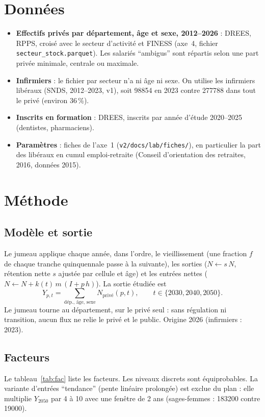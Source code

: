 \documentclass[11pt]{article}
\begin{document}
\section{Données}
\begin{itemize}
  \item \textbf{Effectifs privés par département, âge et sexe, 2012--2026} : DREES, RPPS, croisé avec le secteur
        d'activité et FINESS (axe~4, fichier \texttt{secteur\_stock.parquet}). Les salariés
        \enquote{ambigus} sont répartis selon une part privée minimale, centrale ou maximale.
  \item \textbf{Infirmiers} : le fichier par secteur n'a ni âge ni sexe. On utilise les infirmiers libéraux (SNDS,
        2012--2023, v1), soit \num{98854}\mesure{} en 2023 contre \num{277788}\mesure{} dans tout le privé
        (environ 36\,\%\derive{}).
  \item \textbf{Inscrits en formation} : DREES, inscrits par année d'étude 2020--2025 (dentistes, pharmaciens).
  \item \textbf{Paramètres} : fiches de l'axe~1 (\texttt{v2/docs/lab/fiches/}), en particulier la part des
        libéraux en cumul emploi-retraite (Conseil d'orientation des retraites, 2016, données 2015).
\end{itemize}

\section{Méthode}
\subsection{Modèle et sortie}
Le jumeau applique chaque année, dans l'ordre, le vieillissement (une fraction $f$ de chaque tranche quinquennale
passe à la suivante), les sorties ($N \leftarrow s\,N$, rétention nette $s$ ajustée par cellule et âge) et les
entrées nettes ($N \leftarrow N + k(t)\,m\,(I + p\,h)$). La sortie étudiée est
\[
  Y_{p,t} = \sum_{\text{dép., âge, sexe}} N_{\text{privé}}(p, t), \qquad t \in \{2030, 2040, 2050\}.
\]
Le jumeau tourne au département, sur le privé seul : sans régulation ni transition, aucun flux ne relie le privé et
le public. Origine 2026 (infirmiers : 2023).

\subsection{Facteurs}
Le tableau~\ref{tab:fac} liste les facteurs. Les niveaux discrets sont équiprobables\suppose{}. La variante
d'entrées \enquote{tendance} (pente linéaire prolongée) est exclue du plan : elle multiplie $Y_{2050}$ par 4 à
10\mesure{} avec une fenêtre de 2 ans (sages-femmes : \num{183200} contre \num{19000}\mesure{}).
\end{document}
